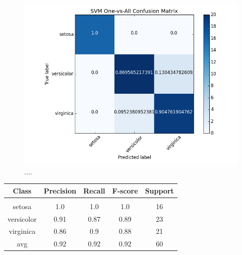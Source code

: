 \documentclass[11pt]{article}
\newenvironment{code}{\captionsetup{type=listing}}{}
\begin{document}
\begin{figure}[H]
\centering
\includegraphics{svm_linear_1va_cm.png}
\caption{....}
\label{fig:q5_1va}
\end{figure}
\begin{table}[h]
\centering
\begin{tabular}{c | c c c c}
Class & Precision & Recall & F-score & Support\\
\hline
\hline\\
setosa & 1.0 & 1.0 & 1.0 & 16\\
versicolor & 0.91 & 0.87 & 0.89 & 23\\
virginica & 0.86 & 0.9 & 0.88 & 21\\
avg & 0.92 & 0.92 & 0.92 & 60\\
\end{tabular}
\end{table}
\begin{code}
\label{code:q4}
\end{code}
\newpage
\end{document}

